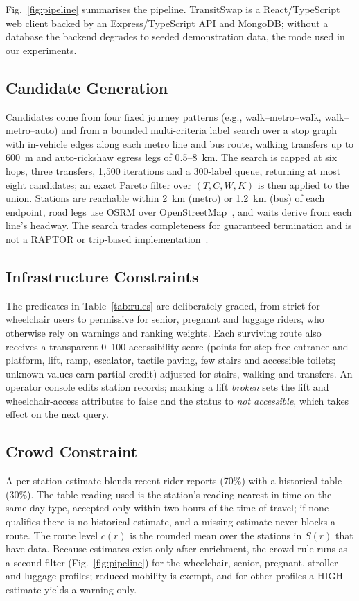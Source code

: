 \documentclass[conference]{IEEEtran}
\begin{document}
Fig.~\ref{fig:pipeline} summarises the pipeline. TransitSwap is a React/TypeScript web client backed by an Express/TypeScript API and MongoDB; without a database the backend degrades to seeded demonstration data, the mode used in our experiments.

\subsection{Candidate Generation}
Candidates come from four fixed journey patterns (e.g., walk--metro--walk, walk--metro--auto) and from a bounded multi-criteria label search over a stop graph with in-vehicle edges along each metro line and bus route, walking transfers up to 600~m and auto-rickshaw egress legs of 0.5--8~km. The search is capped at six hops, three transfers, 1,500 iterations and a 300-label queue, returning at most eight candidates; an exact Pareto filter over $(T, C, W, K)$ is then applied to the union. Stations are reachable within 2~km (metro) or 1.2~km (bus) of each endpoint, road legs use OSRM over OpenStreetMap~\cite{acharya2025osm}, and waits derive from each line's headway. The search trades completeness for guaranteed termination and is not a RAPTOR or trip-based implementation~\cite{agarwal2024tbtr,grossmann2026flash}.

\subsection{Infrastructure Constraints}
The predicates in Table~\ref{tab:rules} are deliberately graded, from strict for wheelchair users to permissive for senior, pregnant and luggage riders, who otherwise rely on warnings and ranking weights. Each surviving route also receives a transparent 0--100 accessibility score (points for step-free entrance and platform, lift, ramp, escalator, tactile paving, few stairs and accessible toilets; unknown values earn partial credit) adjusted for stairs, walking and transfers. An operator console edits station records; marking a lift \emph{broken} sets the lift and wheelchair-access attributes to false and the status to \emph{not accessible}, which takes effect on the next query.

\subsection{Crowd Constraint}
A per-station estimate blends recent rider reports (70\%) with a historical table (30\%). The table reading used is the station's reading nearest in time on the same day type, accepted only within two hours of the time of travel; if none qualifies there is no historical estimate, and a missing estimate never blocks a route. The route level $c(r)$ is the rounded mean over the stations in $S(r)$ that have data. Because estimates exist only after enrichment, the crowd rule runs as a second filter (Fig.~\ref{fig:pipeline}) for the wheelchair, senior, pregnant, stroller and luggage profiles; reduced mobility is exempt, and for other profiles a HIGH estimate yields a warning only.
\end{document}
